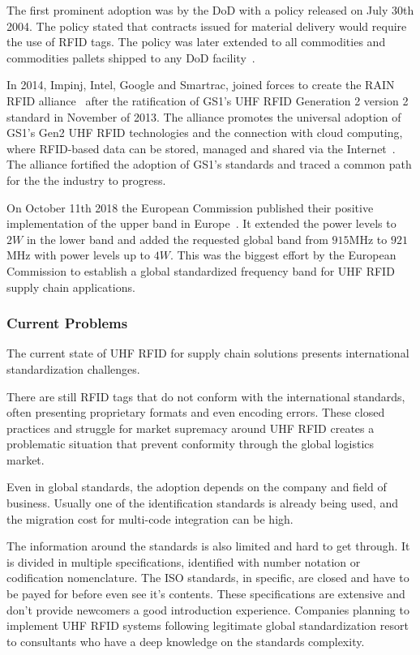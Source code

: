 The first prominent adoption was by the \gls{DoD} with a policy released on July 30th 2004. The policy stated that contracts issued for material delivery would require the use of RFID tags. The policy was later extended to all commodities and commodities pallets shipped to any \gls{DoD} facility~\cite{DoDSuppliersPassive, DODReleasesFinal}.

In 2014, Impinj, Intel, Google and Smartrac, joined forces to create the \gls{RAIN RFID} alliance~\cite{TechnologyCompaniesCreate} after the ratification of \gls{GS1}'s \gls{UHF RFID} Generation 2 version 2 standard in November of 2013. The alliance promotes the universal adoption of \gls{GS1}'s Gen2 \gls{UHF RFID} technologies and the connection with \gls{cloud computing}, where RFID-based data can be stored, managed and shared via the Internet~\cite{WhatRAINRFID}.
The alliance fortified the adoption of \gls{GS1}'s standards and traced a common path for the the industry to progress.

On October 11th 2018 the European Commission published their positive implementation of the upper band in Europe~\cite{302208v030101pPdf}.
It extended the power levels to $2W$ in the lower band and added the requested global band from $915$MHz to $921$MHz with power levels up to $4W$. 
This was the biggest effort by the European Commission to establish a global standardized frequency band for \gls{UHF RFID} \gls{supply chain} applications.

\subsubsection{Current Problems}

The current state of \gls{UHF RFID} for supply chain solutions presents international standardization challenges.

There are still \gls{RFID} tags that do not conform with the international standards, often presenting proprietary formats and even encoding errors.
These closed practices and struggle for market supremacy around \gls{UHF RFID} creates a problematic situation that prevent conformity through the global logistics market.

Even in global standards, the adoption depends on the company and field of business. Usually one of the identification standards is already being used, and the migration cost for multi-code integration can be high.

The information around the standards is also limited and hard to get through. It is divided in multiple specifications, identified with number notation or codification nomenclature. 
The ISO standards, in specific, are closed and have to be payed for before even see it's contents.
These specifications are extensive and don't provide newcomers a good introduction experience. 
Companies planning to implement \gls{UHF RFID} systems following legitimate global standardization resort to consultants who have a deep knowledge on the standards complexity.

